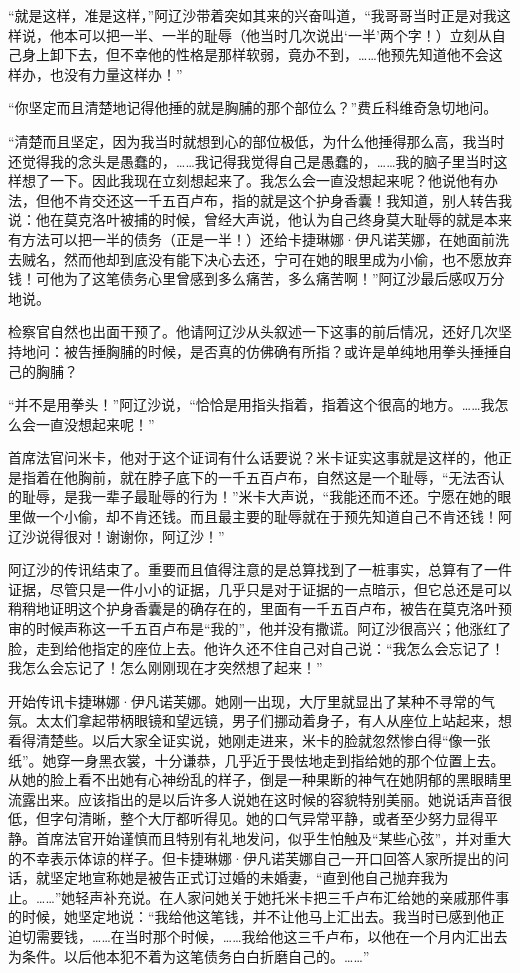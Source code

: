 \par “就是这样，准是这样，”阿辽沙带着突如其来的兴奋叫道，“我哥哥当时正是对我这样说，他本可以把一半、一半的耻辱（他当时几次说出‘一半’两个字！）立刻从自己身上卸下去，但不幸他的性格是那样软弱，竟办不到，……他预先知道他不会这样办，也没有力量这样办！”
\par “你坚定而且清楚地记得他捶的就是胸脯的那个部位么？”费丘科维奇急切地问。
\par “清楚而且坚定，因为我当时就想到心的部位极低，为什么他捶得那么高，我当时还觉得我的念头是愚蠢的，……我记得我觉得自己是愚蠢的，……我的脑子里当时这样想了一下。因此我现在立刻想起来了。我怎么会一直没想起来呢？他说他有办法，但他不肯交还这一千五百卢布，指的就是这个护身香囊！我知道，别人转告我说：他在莫克洛叶被捕的时候，曾经大声说，他认为自己终身莫大耻辱的就是本来有方法可以把一半的债务（正是一半！）还给卡捷琳娜·伊凡诺芙娜，在她面前洗去贼名，然而他却到底没有能下决心去还，宁可在她的眼里成为小偷，也不愿放弃钱！可他为了这笔债务心里曾感到多么痛苦，多么痛苦啊！”阿辽沙最后感叹万分地说。
\par 检察官自然也出面干预了。他请阿辽沙从头叙述一下这事的前后情况，还好几次坚持地问：被告捶胸脯的时候，是否真的仿佛确有所指？或许是单纯地用拳头捶捶自己的胸脯？
\par “并不是用拳头！”阿辽沙说，“恰恰是用指头指着，指着这个很高的地方。……我怎么会一直没想起来呢！”
\par 首席法官问米卡，他对于这个证词有什么话要说？米卡证实这事就是这样的，他正是指着在他胸前，就在脖子底下的一千五百卢布，自然这是一个耻辱，“无法否认的耻辱，是我一辈子最耻辱的行为！”米卡大声说，“我能还而不还。宁愿在她的眼里做一个小偷，却不肯还钱。而且最主要的耻辱就在于预先知道自己不肯还钱！阿辽沙说得很对！谢谢你，阿辽沙！”
\par 阿辽沙的传讯结束了。重要而且值得注意的是总算找到了一桩事实，总算有了一件证据，尽管只是一件小小的证据，几乎只是对于证据的一点暗示，但它总还是可以稍稍地证明这个护身香囊是的确存在的，里面有一千五百卢布，被告在莫克洛叶预审的时候声称这一千五百卢布是“我的”，他并没有撒谎。阿辽沙很高兴；他涨红了脸，走到给他指定的座位上去。他许久还不住自己对自己说：“我怎么会忘记了！我怎么会忘记了！怎么刚刚现在才突然想了起来！”
\par 开始传讯卡捷琳娜·伊凡诺芙娜。她刚一出现，大厅里就显出了某种不寻常的气氛。太太们拿起带柄眼镜和望远镜，男子们挪动着身子，有人从座位上站起来，想看得清楚些。以后大家全证实说，她刚走进来，米卡的脸就忽然惨白得“像一张纸”。她穿一身黑衣裳，十分谦恭，几乎近于畏怯地走到指给她的那个位置上去。从她的脸上看不出她有心神纷乱的样子，倒是一种果断的神气在她阴郁的黑眼睛里流露出来。应该指出的是以后许多人说她在这时候的容貌特别美丽。她说话声音很低，但字句清晰，整个大厅都听得见。她的口气异常平静，或者至少努力显得平静。首席法官开始谨慎而且特别有礼地发问，似乎生怕触及“某些心弦”，并对重大的不幸表示体谅的样子。但卡捷琳娜·伊凡诺芙娜自己一开口回答人家所提出的问话，就坚定地宣称她是被告正式订过婚的未婚妻，“直到他自己抛弃我为止。……”她轻声补充说。在人家问她关于她托米卡把三千卢布汇给她的亲戚那件事的时候，她坚定地说：“我给他这笔钱，并不让他马上汇出去。我当时已感到他正迫切需要钱，……在当时那个时候，……我给他这三千卢布，以他在一个月内汇出去为条件。以后他本犯不着为这笔债务白白折磨自己的。……”
